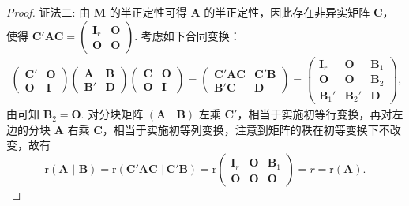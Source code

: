 \documentclass[../../main.tex]{subfiles}%
\begin{document}
\begin{proof}
{\color{blue}证法二:}
由 $\boldsymbol{M}$ 的半正定性可得 $\boldsymbol{A}$ 的半正定性，因此存在非异实矩阵 $\boldsymbol{C}$，使得 $\boldsymbol{C}'\boldsymbol{A}\boldsymbol{C}=\begin{pmatrix}
\boldsymbol{I}_r & \boldsymbol{O} \\
\boldsymbol{O} & \boldsymbol{O}
\end{pmatrix}$. 考虑如下合同变换：
\begin{align*}
\begin{pmatrix}
\boldsymbol{C}' & \boldsymbol{O} \\
\boldsymbol{O} & \boldsymbol{I}
\end{pmatrix}
\begin{pmatrix}
\boldsymbol{A} & \boldsymbol{B} \\
\boldsymbol{B}' & \boldsymbol{D}
\end{pmatrix}
\begin{pmatrix}
\boldsymbol{C} & \boldsymbol{O} \\
\boldsymbol{O} & \boldsymbol{I}
\end{pmatrix}=
\begin{pmatrix}
\boldsymbol{C}'\boldsymbol{A}\boldsymbol{C} & \boldsymbol{C}'\boldsymbol{B} \\
\boldsymbol{B}'\boldsymbol{C} & \boldsymbol{D}
\end{pmatrix}=
\begin{pmatrix}
\boldsymbol{I}_r & \boldsymbol{O} & \boldsymbol{B}_1 \\
\boldsymbol{O} & \boldsymbol{O} & \boldsymbol{B}_2 \\
\boldsymbol{B}_1' & \boldsymbol{B}_2' & \boldsymbol{D}
\end{pmatrix},
\end{align*}
由可知 $\boldsymbol{B}_2 = \boldsymbol{O}$. 对分块矩阵 $\left( \boldsymbol{A}\,\,|\,\,\boldsymbol{B} \right)$ 左乘 $\boldsymbol{C}'$，相当于实施初等行变换，再对左边的分块 $\boldsymbol{A}$ 右乘 $\boldsymbol{C}$，相当于实施初等列变换，注意到矩阵的秩在初等变换下不改变，故有
\[
\mathrm{r}\left( \boldsymbol{A}\,\,|\,\,\boldsymbol{B} \right) =\mathrm{r}\left( \boldsymbol{C}' \boldsymbol{AC}\,\,|\,\boldsymbol{C}' \boldsymbol{B} \right) =\mathrm{r}\begin{pmatrix}
\boldsymbol{I}_r & \boldsymbol{O} & \boldsymbol{B}_1 \\
\boldsymbol{O} & \boldsymbol{O} & \boldsymbol{O}
\end{pmatrix}=r = \mathrm{r}(\boldsymbol{A}).\]
\end{proof}
\end{document}
